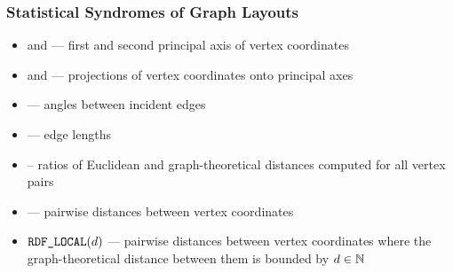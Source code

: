 \documentclass{beamer}
\begin{document}
\begin{frame}
  \frametitle{Statistical Syndromes of Graph Layouts}
  \begin{itemize}
    \item{} and  --- first and second principal axis of vertex coordinates
    \item{} and  --- projections of vertex coordinates onto principal axes
    \item{} --- angles between incident edges
    \item{} --- edge lengths
    \item{} -- ratios of Euclidean and graph-theoretical distances computed for all vertex pairs
    \item{} --- pairwise distances between vertex coordinates
    \item\(\mbox{\text{\upshape\ttfamily RDF\_LOCAL}}(d)\) --- pairwise distances between vertex coordinates where the graph-theoretical
      distance between them is bounded by $d\in\mathbb{N}$
  \end{itemize}
  \par\vfill
\end{frame}


\end{document}
